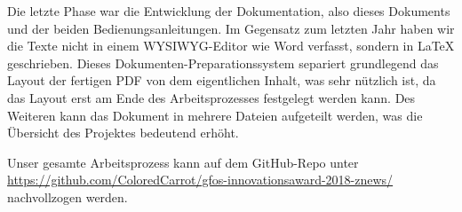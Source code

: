 Die letzte Phase war die Entwicklung der Dokumentation,
also dieses Dokuments und der beiden Bedienungsanleitungen.
Im Gegensatz zum letzten Jahr haben wir die Texte nicht in einem WYSIWYG-Editor wie Word verfasst,
sondern in \LaTeX{} geschrieben.
Dieses Dokumenten-Preparationssystem separiert grundlegend das Layout der fertigen PDF
von dem eigentlichen Inhalt,
was sehr nützlich ist,
da das Layout erst am Ende des Arbeitsprozesses festgelegt werden kann.
Des Weiteren kann das Dokument in mehrere Dateien aufgeteilt werden,
was die Übersicht des Projektes bedeutend erhöht.

Unser gesamte Arbeitsprozess kann auf dem GitHub-Repo unter
\url{https://github.com/ColoredCarrot/gfos-innovationsaward-2018-znews/}
nachvollzogen werden.
